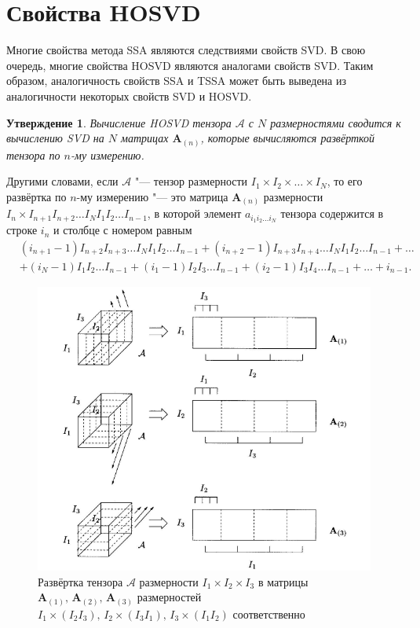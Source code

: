 \documentclass[specialist,
    substylefile = spbu_report.rtx,
    subf,href,colorlinks=true, 12pt]{disser}
\theoremstyle{plain}
\newtheorem{statement}{Утверждение}[section]
\theoremstyle{definition}
\theoremstyle{remark}
\begin{document}
    \section{Свойства HOSVD}\label{sec:hosvd-properties}
    Многие свойства метода SSA являются следствиями свойств SVD\@.
    В свою очередь, многие свойства HOSVD являются аналогами свойств SVD\@.
    Таким образом, аналогичность свойств SSA и TSSA может быть выведена из аналогичности некоторых свойств SVD и HOSVD\@.
    \begin{statement}
        Вычисление \emph{HOSVD} тензора $\mathcal{A}$ с $N$ размерностями сводится к вычислению \emph{SVD} на $N$ матрицах $\mathbf{A}_{(n)}$,
        которые вычисляются развёрткой тензора по $n$-му измерению.
    \end{statement}
    Другими словами, если $\mathcal{A}$ "--- тензор размерности $I_1\times I_2\times\ldots\times I_N$, то его развёртка
    по $n$-му измерению "--- это матрица $\mathbf{A}_{(n)}$ размерности $I_n\times I_{n+1}I_{n+2}\ldots I_{N}I_{1}I_{2}\ldots
    I_{n-1}$, в которой элемент $a_{i_1 i_2\ldots i_N}$ тензора содержится в строке $i_n$ и столбце с номером равным
    \[\begin{aligned}
          &(i_{n+1} - 1)I_{n+2}I_{n+3}\ldots I_{N}I_1 I_2\ldots I_{n-1} + (i_{n+2} - 1)I_{n+3}I_{n+4}\ldots I_N I_1 I_2 \ldots
          I_{n-1} + \dots \\
          &+(i_N - 1)I_1 I_2 \ldots I_{n-1} + (i_1 - 1)I_2 I_3\ldots I_{n-1} + (i_2 - 1)I_3 I_4\ldots I_{n-1} + \dots + i_{n-1}.
    \end{aligned}
    \]

    \begin{figure}[!h]
        \centering
        \includegraphics[width=\textwidth]{unfolding}
        \caption{Развёртка тензора $\mathcal{A}$ размерности $I_1\times I_2 \times I_3$ в матрицы $\mathbf{A}_{(1)},\,
        \mathbf{A}_{(2)},\, \mathbf{A}_{(3)}$ размерностей $I_1\times (I_2 I_3),\, I_2\times (I_3 I_1),\, I_3\times (I_1 I_2)$
            соответственно}
        \label{fig:unfolding}
    \end{figure}
\end{document}
